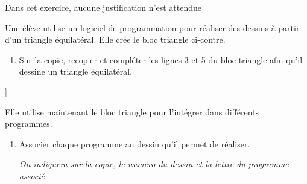 \documentclass[11pt]{article}
\begin{document}
Dans cet exercice, aucune justification n'est attendue

Une élève utilise un logiciel de programmation pour réaliser des dessins à partir d'un triangle équilatéral. Elle crée le bloc \og triangle \fg ci-contre.%

\medskip

\begin{minipage}{0.62\linewidth}
\begin{enumerate}
\item Sur la copie, recopier et compléter les lignes 3 et 5 du bloc \og triangle \fg{} afin qu'il dessine un triangle équilatéral.
\end{enumerate}
\end{minipage}\hfill
\begin{minipage}{0.30\linewidth}
\begin{scratch}[scale=0.8,num blocks, num start=1,baseline=2]]
{
}

\end{scratch}
\end{minipage}

\medskip

Elle utilise maintenant le bloc \og triangle \fg{} pour l'intégrer dans différents programmes.

\medskip

\begin{enumerate}[start=2]
\item Associer chaque programme au dessin qu'il permet de réaliser.

\emph{On indiquera sur la copie, le numéro du dessin et la lettre du programme associé.}
\end{enumerate}
\end{document}
